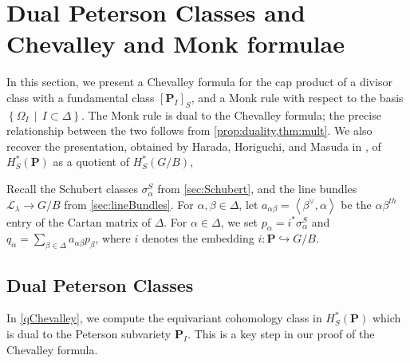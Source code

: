 \documentclass[10pt]{article}
\numberwithin{thm}{section}
\theoremstyle{definition}
\theoremstyle{remark}
\newcommand{\Pet}{\ensuremath{\mathbf{P}}}
\newcommand{\Fl}{\ensuremath{G/B}}
\newcommand{\set}[2]{\left\{#1\,\middle\vert\,#2\right\}}
\begin{document}
\section{Dual Peterson Classes and Chevalley and Monk formulae}
\label{sec:chevalley}
In this section,
we present a Chevalley formula for the cap product of a divisor class with a fundamental class $[\Pet_I]_S$,
and a Monk rule with respect to the basis $\set{\Omega_I}{I\subset\Delta}$.
The Monk rule is dual to the Chevalley formula;
the precise relationship between the two follows from \cref{prop:duality,thm:mult}.
We also recover the presentation, obtained by Harada, Horiguchi, and Masuda in \cite{harada.horiguchi.masuda:Peterson},
of $H^*_S(\Pet)$ as a quotient of $H^*_S(\Fl)$,

Recall the Schubert classes $\sigma^S_\alpha$ from \cref{sec:Schubert},
and the line bundles $\mathcal L_\lambda\to\Fl$ from \cref{sec:lineBundles}.
For $\alpha,\beta\in\Delta$, let $a_{\alpha\beta}=\left\langle\beta^\vee,\alpha\right\rangle$ be the $\alpha\beta^{th}$ entry of the Cartan matrix of $\Delta$.
For $\alpha\in\Delta$,
we set $p_\alpha=i^*\sigma_\alpha^S$ and $q_\alpha=\sum_{\beta\in\Delta}a_{\alpha\beta} p_\beta$,
where $i$ denotes the embedding $i:\Pet\hookrightarrow\Fl$.

\subsection{Dual Peterson Classes}
In \cref{qChevalley}, we compute the equivariant cohomology class in $H^*_S(\Pet)$ which is dual to the Peterson subvariety $\Pet_I$.
This is a key step in our proof of the Chevalley formula.
\end{document}
